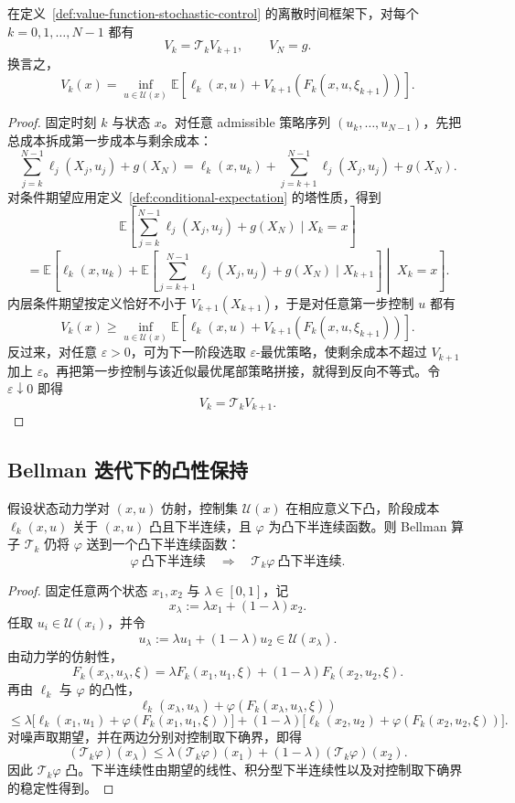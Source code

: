 \begin{theorem}[动态规划原理]\label{thm:dynamic-programming-principle}
在定义~\ref{def:value-function-stochastic-control} 的离散时间框架下，对每个 $k=0,1,\dots,N-1$ 都有
\[
V_k=\mathcal T_k V_{k+1},
\qquad
V_N=g.
\]
换言之，
\[
V_k(x)
=
\inf_{u\in \mathcal U(x)}
\mathbb E\!\left[
\ell_k(x,u)+V_{k+1}(F_k(x,u,\xi_{k+1}))
\right].
\]
\end{theorem}

\begin{proof}
固定时刻 $k$ 与状态 $x$。对任意 admissible 策略序列 $(u_k,\dots,u_{N-1})$，先把总成本拆成第一步成本与剩余成本：
\[
\sum_{j=k}^{N-1}\ell_j(X_j,u_j)+g(X_N)
=
\ell_k(x,u_k)+\sum_{j=k+1}^{N-1}\ell_j(X_j,u_j)+g(X_N).
\]
对条件期望应用定义~\ref{def:conditional-expectation} 的塔性质，得到
\[
\mathbb E\!\left[
\sum_{j=k}^{N-1}\ell_j(X_j,u_j)+g(X_N)\mid X_k=x
\right]
\]
\[
=
\mathbb E\!\left[
\ell_k(x,u_k)+
\mathbb E\!\left[
\sum_{j=k+1}^{N-1}\ell_j(X_j,u_j)+g(X_N)\mid X_{k+1}
\right]
\middle|\; X_k=x
\right].
\]
内层条件期望按定义恰好不小于 $V_{k+1}(X_{k+1})$，于是对任意第一步控制 $u$ 都有
\[
V_k(x)\ge
\inf_{u\in \mathcal U(x)}
\mathbb E\!\left[
\ell_k(x,u)+V_{k+1}(F_k(x,u,\xi_{k+1}))
\right].
\]
反过来，对任意 $\varepsilon>0$，可为下一阶段选取 $\varepsilon$-最优策略，使剩余成本不超过 $V_{k+1}$ 加上 $\varepsilon$。再把第一步控制与该近似最优尾部策略拼接，就得到反向不等式。令 $\varepsilon\downarrow 0$ 即得
\[
V_k=\mathcal T_kV_{k+1}.
\]
\end{proof}

\subsection{Bellman 迭代下的凸性保持}

\begin{proposition}\label{prop:bellman-convexity-preservation}
假设状态动力学对 $(x,u)$ 仿射，控制集 $\mathcal U(x)$ 在相应意义下凸，阶段成本 $\ell_k(x,u)$ 关于 $(x,u)$ 凸且下半连续，且 $\varphi$ 为凸下半连续函数。则 Bellman 算子 $\mathcal T_k$ 仍将 $\varphi$ 送到一个凸下半连续函数：
\[
\varphi\ \text{凸下半连续}
\quad\Longrightarrow\quad
\mathcal T_k\varphi\ \text{凸下半连续}.
\]
\end{proposition}

\begin{proof}
固定任意两个状态 $x_1,x_2$ 与 $\lambda\in[0,1]$，记
\[
x_\lambda:=\lambda x_1+(1-\lambda)x_2.
\]
任取 $u_i\in \mathcal U(x_i)$，并令
\[
u_\lambda:=\lambda u_1+(1-\lambda)u_2\in \mathcal U(x_\lambda).
\]
由动力学的仿射性，
\[
F_k(x_\lambda,u_\lambda,\xi)
=
\lambda F_k(x_1,u_1,\xi)+(1-\lambda)F_k(x_2,u_2,\xi).
\]
再由 $\ell_k$ 与 $\varphi$ 的凸性，
\[
\ell_k(x_\lambda,u_\lambda)+\varphi(F_k(x_\lambda,u_\lambda,\xi))
\]
\[
\le
\lambda\bigl[\ell_k(x_1,u_1)+\varphi(F_k(x_1,u_1,\xi))\bigr]
+
(1-\lambda)\bigl[\ell_k(x_2,u_2)+\varphi(F_k(x_2,u_2,\xi))\bigr].
\]
对噪声取期望，并在两边分别对控制取下确界，即得
\[
(\mathcal T_k\varphi)(x_\lambda)
\le
\lambda (\mathcal T_k\varphi)(x_1)+(1-\lambda)(\mathcal T_k\varphi)(x_2).
\]
因此 $\mathcal T_k\varphi$ 凸。下半连续性由期望的线性、积分型下半连续性以及对控制取下确界的稳定性得到。
\end{proof}

